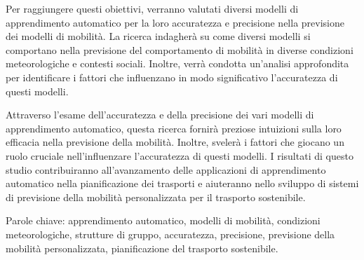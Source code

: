 Per raggiungere questi obiettivi, verranno valutati diversi modelli di apprendimento automatico per la loro accuratezza e precisione nella previsione dei modelli di mobilità. La ricerca indagherà su come diversi modelli si comportano nella previsione del comportamento di mobilità in diverse condizioni meteorologiche e contesti sociali. Inoltre, verrà condotta un'analisi approfondita per identificare i fattori che influenzano in modo significativo l'accuratezza di questi modelli.

Attraverso l'esame dell'accuratezza e della precisione dei vari modelli di apprendimento automatico, questa ricerca fornirà preziose intuizioni sulla loro efficacia nella previsione della mobilità. Inoltre, svelerà i fattori che giocano un ruolo cruciale nell'influenzare l'accuratezza di questi modelli. I risultati di questo studio contribuiranno all'avanzamento delle applicazioni di apprendimento automatico nella pianificazione dei trasporti e aiuteranno nello sviluppo di sistemi di previsione della mobilità personalizzata per il trasporto sostenibile.

Parole chiave: apprendimento automatico, modelli di mobilità, condizioni meteorologiche, strutture di gruppo, accuratezza, precisione, previsione della mobilità personalizzata, pianificazione del trasporto sostenibile.





